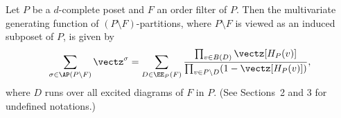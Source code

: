\begin{theo}
\label{thm:main}
Let $P$ be a $d$-complete poset and $F$ an order filter of $P$.
Then the multivariate generating function of $(P \setminus F)$-partitions, 
where $P \setminus F$ is viewed as an induced subposet of $P$, is given by
\begin{equation}
\label{eq:main}
\sum_{\sigma \in \AP(P \setminus F)} \vectz^\sigma
 =
\sum_{D \in \EE_P(F)}
 \frac{ \prod_{v \in B(D)} \vectz[H_P(v)] }
 { \prod_{v \in P \setminus D} ( 1 - \vectz[H_P(v)] ) },
\end{equation}
where $D$ runs over all excited diagrams of $F$ in $P$.
(See Sections~2 and 3 for undefined notations.)
\end{theo}

